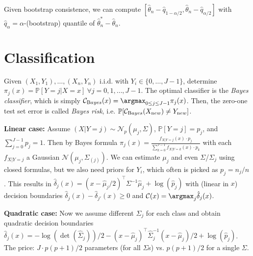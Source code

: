 \begin{sectionbox}\nospacing{}
  Given bootstrap consistence, we can compute $[\hat \theta_n - \hat q_{1-\alpha/2}, \hat\theta_n - \hat q_{\alpha/2}]$ with $\hat q_\alpha = \alpha$-(bootstrap) quantile of $\hat\theta_n^\ast - \hat \theta_n$.
\end{sectionbox}

\section{Classification}\label{sec:classification}
Given $(X_1, Y_1), \dots, (X_n,Y_n)$ i.i.d. with $Y_i \in \{0, \dots, J-1\}$, determine $\pi_j(x) = \mathbb{P}[Y=j|X=x]\ \forall j = 0,1,\dots,J-1$.
The optimal classifier is the \emph{Bayes classifier}, which is simply $\mathcal{C}_{\textrm Bayes}(x) = \argmax_{0\leq j\leq J-1}\pi_j(x)$.
Then, the zero-one test set error is called \emph{Bayes risk}, i.e. $\mathbb{P}[\mathcal{C}_{\textrm Bayes}(X_{\textrm new}) \neq Y_{\textrm new}]$.

\begin{sectionbox}\nospacing{}
  \textbf{Linear case: }Assume $(X | Y=j) \sim \mathcal{N}_p(\mu_j, \Sigma)$, $\mathbb{P}[Y=j] = p_j$, and $\sum_{j=0}^{J-1}p_j=1$.
  Then by Bayes formula $\pi_j(x) = \frac{f_{X|Y=j}(x)\cdot p_j}{\sum_{k=0}^{J-1}f_{X|Y=k}(x)\cdot p_k}$ with each $f_{X|Y=j}$ a Gaussian $\mathcal{N}(\mu_j, \Sigma_{(j)})$.
  We can estimate $\mu_j$ and even $\Sigma$/$\Sigma_j$ using closed formulas, but we also need priors for $Y_i$, which often is picked as $p_j=n_j/n$.
  This results in $\hat \delta_j(x) = (x-\hat{\mu}_j/2)^{\top}\Sigma^{-1}\hat{\mu}_j+\log(\hat p_j)$ with (linear in $x$) decision boundaries $\hat{\delta}_j(x) - \hat \delta_{j'}(x) \geq 0$ and $\mathcal{C}(x) = \argmax_j \hat \delta_j(x)$.

  \textbf{Quadratic case: } Now we assume different $\Sigma_j$ for each class and obtain quadratic decision boundaries $\hat{\delta}_j(x) = -\log(\det(\hat\Sigma_j))/2 - (x-\hat{\mu}_j)^{\top}\hat{\Sigma}_j^{-1}(x-\hat{\mu}_j)/2 + \log(\hat p_j)$.
  The price: $J\cdot p(p+1)/2$ parameters (for all $\Sigma$s) vs. $p(p+1)/2$ for a single $\Sigma$.
\end{sectionbox}

